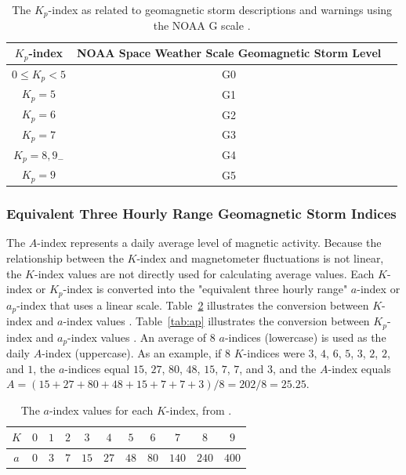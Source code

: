\documentclass[sn-mathphys-num]{sn-jnl}%
\begin{document}
\begin{table}[!ht]
    \centering
    \caption{The $K_{p}$-index as related to geomagnetic storm descriptions and warnings using the NOAA G scale \cite{NOAA2024eSpace, NOAA2024fScales}.}
    \label{tab:Kp}
    \begin{tabular}{|c|c|c|}
        \hline
        $K_{p}$-index & NOAA Space Weather Scale Geomagnetic Storm Level \\ \hline
        $0\leq K_{p}<5$ & G0 \\ \hline
        $K_{p}=5$ & G1 \\ \hline
        $K_{p}=6$ & G2 \\ \hline
        $K_{p}=7$ & G3 \\ \hline
        $K_{p}=8, 9_{-}$ & G4 \\ \hline
        $K_{p}=9$ & G5 \\ \hline
    \end{tabular}
\end{table}

\subsubsection{Equivalent Three Hourly Range Geomagnetic Storm Indices}

The $A$-index \cite{NOAA2024gGeomagneticIndices} represents a daily average level of magnetic activity. Because the relationship between the $K$-index and magnetometer fluctuations is not linear, the $K$-index values are not directly used for calculating average values. Each $K$-index or $K_{p}$-index is converted into the "equivalent three hourly range" $a$-index or $a_{p}$-index that uses a linear scale. Table~\ref{tab:a} illustrates the conversion between $K$-index and $a$-index values \cite{NOAA2024bKindex}. Table~\ref{tab:ap} illustrates the conversion between $K_{p}$-index and $a_{p}$-index values \cite{NOAA2024gGeomagneticIndices}. An average of $8$ $a$-indices (lowercase) is used as the daily $A$-index (uppercase). As an example, if $8$ $K$-indices were $3$, $4$, $6$, $5$, $3$, $2$, $2$, and $1$, the $a$-indices equal $15$, $27$, $80$, $48$, $15$, $7$, $7$, and $3$, and the $A$-index equals $A = (15 + 27 + 80 + 48 + 15 + 7 + 7 + 3)/8 = 202 / 8 = 25.25$.

\begin{table}[!ht]
    \centering
    \caption{The $a$-index values for each $K$-index, from \cite{NOAA2024bKindex}.}
    \label{tab:a}
    \begin{tabular}{|c|c|c|c|c|c|c|c|c|c|c|}
        \hline
        $K$ & $0$ & $1$ & $2$ & $3$ & $4$ & $5$ & $6$ & $7$ & $8$ & $9$ \\ \hline
        $a$ & $0$ & $3$ & $7$ & $15$ & $27$ & $48$ & $80$ & $140$ & $240$ & $400$ \\ \hline
    \end{tabular}
\end{table}
\end{document}
